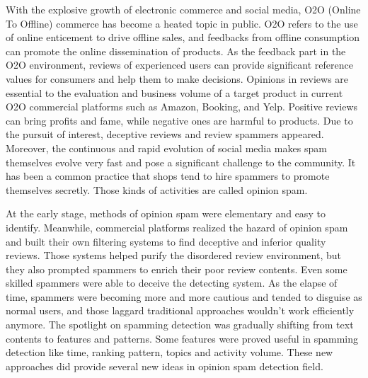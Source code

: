 \begin{bigabstract}

With the explosive growth of electronic commerce and social media, O2O (Online To Offline) commerce has become a heated topic in public. O2O refers to the use of online enticement to drive offline sales, and feedbacks from offline consumption can promote the online dissemination of products. As the feedback part in the O2O environment, reviews of experienced users can provide significant reference values for consumers and help them to make decisions. Opinions in reviews are essential to the evaluation and business volume of a target product in current O2O commercial platforms such as Amazon, Booking, and Yelp. Positive reviews can bring profits and fame, while negative ones are harmful to products. Due to the pursuit of interest, deceptive reviews and review spammers appeared. Moreover, the continuous and rapid evolution of social media makes spam themselves evolve very fast and pose a significant challenge to the community. It has been a common practice that shops tend to hire spammers to promote themselves secretly.  Those kinds of activities are called opinion spam.

At the early stage, methods of opinion spam were elementary and easy to identify. Meanwhile, commercial platforms realized the hazard of opinion spam and built their own filtering systems to find deceptive and inferior quality reviews. Those systems helped purify the disordered review environment, but they also prompted spammers to enrich their poor review contents. Even some skilled spammers were able to deceive the detecting system. As the elapse of time, spammers were becoming more and more cautious and tended to disguise as normal users, and those laggard traditional approaches wouldn't work efficiently anymore. The spotlight on spamming detection was gradually shifting from text contents to features and patterns. Some features were proved useful in spamming detection like time, ranking pattern, topics and activity volume. These new approaches did provide several new ideas in opinion spam detection field. 


\end{bigabstract}
